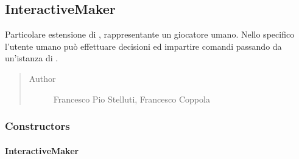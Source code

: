 \documentclass[letterpaper,10pt,italian,openany,oneside]{sphinxmanual}
\begin{document}
\subsection{InteractiveMaker}
\label{\detokenize{source/it/unicam/cs/pa/mastermind/players/InteractiveMaker:interactivemaker}}\label{\detokenize{source/it/unicam/cs/pa/mastermind/players/InteractiveMaker::doc}}

\begin{fulllineitems}
\label{\detokenize{source/it/unicam/cs/pa/mastermind/players/InteractiveMaker:it.unicam.cs.pa.mastermind.players.InteractiveMaker}}
Particolare estensione di , rappresentante un giocatore umano. Nello specifico l’utente umano può effettuare decisioni ed impartire comandi passando da un’istanza di .
\begin{quote}\begin{description}
\item[{Author}] \leavevmode
Francesco Pio Stelluti, Francesco Coppola

\end{description}\end{quote}

\end{fulllineitems}



\subsubsection{Constructors}
\label{\detokenize{source/it/unicam/cs/pa/mastermind/players/InteractiveMaker:constructors}}

\paragraph{InteractiveMaker}
\label{\detokenize{source/it/unicam/cs/pa/mastermind/players/InteractiveMaker:id1}}

\begin{fulllineitems}
\label{\detokenize{source/it/unicam/cs/pa/mastermind/players/InteractiveMaker:it.unicam.cs.pa.mastermind.players.InteractiveMaker.InteractiveMaker(GameView, int)}}
\end{fulllineitems}
\end{document}
